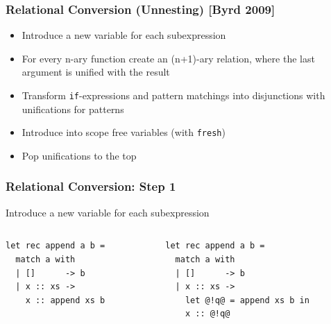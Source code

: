\documentclass[xcolor=table]{beamer}
\begin{document}
\begin{frame}[fragile]
  \transwipe[direction=90]
  \frametitle{Relational Conversion (Unnesting) [Byrd 2009]}


\begin{itemize}
  \item Introduce a new variable for each subexpression
  \item For every n-ary function create an (n+1)-ary relation, where the last argument is unified with the result
  \item Transform \lstinline{if}-expressions and pattern matchings into disjunctions with unifications for patterns
  \item Introduce into scope free variables (with \lstinline{fresh})
  \item Pop unifications to the top
\end{itemize}
\end{frame}

\begin{frame}[fragile]
  \transwipe[direction=90]
  \frametitle{Relational Conversion: Step 1}
\begin{center}  
Introduce a new variable for each subexpression
\end{center}

\begin{columns}
\begin{column}{0.5\textwidth}
\begin{lstlisting}
let rec append a b =
  match a with
  | []      -> b
  | x :: xs -> 
    x :: append xs b
\end{lstlisting}
\end{column}
\begin{column}{0.5\textwidth}  
\begin{lstlisting}
let rec append a b =
  match a with 
  | []      -> b
  | x :: xs -> 
    let @!q@ = append xs b in
    x :: @!q@
\end{lstlisting}
\end{column}
\end{columns}
\end{frame}
\end{document}
